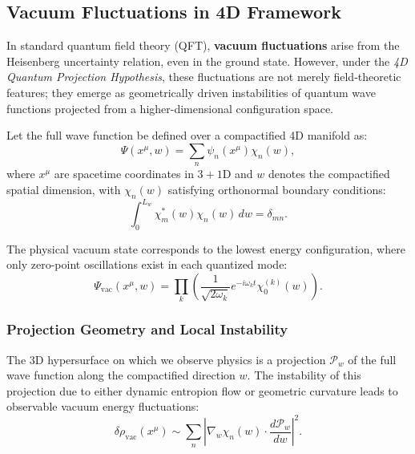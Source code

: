 \documentclass[12pt]{article}
\begin{document}
\subsection{Vacuum Fluctuations in 4D Framework}
\label{subsec:vacuum_fluctuations_4d}

In standard quantum field theory (QFT), \textbf{vacuum fluctuations} arise from the Heisenberg uncertainty relation, even in the ground state. However, under the \emph{4D Quantum Projection Hypothesis}, these fluctuations are not merely field-theoretic features; they emerge as geometrically driven instabilities of quantum wave functions projected from a higher-dimensional configuration space.

Let the full wave function be defined over a compactified 4D manifold as:
\begin{equation}
\Psi(x^\mu, w) = \sum_{n} \psi_n(x^\mu) \chi_n(w),
\label{eq:full_wave_expansion}
\end{equation}
where \(x^\mu\) are spacetime coordinates in \(3+1\)D and \(w\) denotes the compactified spatial dimension, with \(\chi_n(w)\) satisfying orthonormal boundary conditions:
\begin{equation}
\int_{0}^{L_w} \chi_m^*(w) \chi_n(w) \, dw = \delta_{mn}.
\end{equation}

The physical vacuum state corresponds to the lowest energy configuration, where only zero-point oscillations exist in each quantized mode:
\begin{equation}
\Psi_{\text{vac}}(x^\mu, w) = \prod_k \left( \frac{1}{\sqrt{2\omega_k}} e^{-i \omega_k t} \chi_{0}^{(k)}(w) \right).
\label{eq:vac_state}
\end{equation}

\subsubsection*{Projection Geometry and Local Instability}

The 3D hypersurface on which we observe physics is a projection \(\mathcal{P}_w\) of the full wave function along the compactified direction \(w\). The instability of this projection due to either dynamic entropion flow or geometric curvature leads to observable vacuum energy fluctuations:
\begin{equation}
\delta \rho_{\text{vac}}(x^\mu) \sim \sum_n \left| \nabla_w \chi_n(w) \cdot \frac{d \mathcal{P}_w}{dw} \right|^2.
\label{eq:instability_density}
\end{equation}
\end{document}
